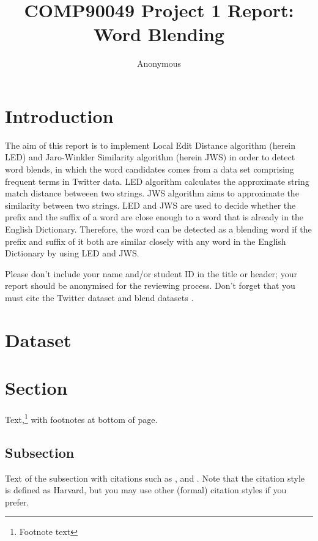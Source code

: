 \documentclass[11pt]{article}
\title{COMP90049 Project 1 Report: Word Blending}
\author
{Anonymous}
\begin{document}
\maketitle



\section{Introduction}

The aim of this report is to implement Local Edit Distance algorithm (herein LED) and Jaro-Winkler Similarity algorithm (herein JWS) in order to detect word blends, in which the word candidates comes from a data set comprising frequent terms in Twitter data. LED algorithm calculates the approximate string match distance betweeen two strings. JWS algorithm aims to approximate the similarity between two strings. LED and JWS are used to decide whether the prefix and the suffix of a word are close enough to a word that is already in the English Dictionary. Therefore, the word can be detected as a blending word if the prefix and suffix of it both are similar closely with any word in the English Dictionary by using LED and JWS.

Please don't include your name and/or student ID in the title or header; 
your report should be anonymised for the reviewing process. Don't forget
that you must cite the Twitter dataset \citep{Eis+10} and blend datasets
\citep{DerKni15, DasGho17, CooSte10}.

\section{Dataset}



\section{Section}

Text,\footnote{Footnote text} with footnotes at bottom of page.


\subsection{Subsection}

Text of the subsection with citations such as 
\citet{Spa72}, \citet{Kay86} and \citet{MosWal64}.
Note that the citation style is defined as Harvard,
but you may use other (formal) citation styles if you prefer.
\end{document}
